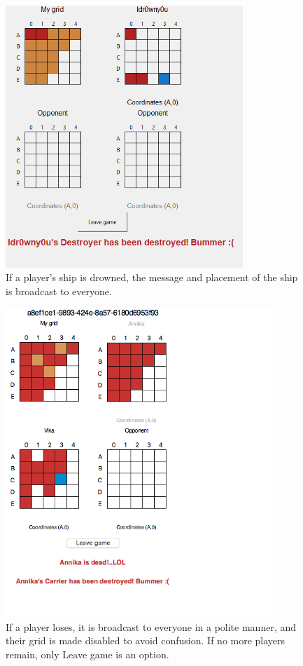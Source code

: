\documentclass[]{article}
\begin{document}
\begin{figure}[!hbt]
	\centering
	\includegraphics[width=0.8\textwidth]{ShipDown.png}
	\caption{If a player's ship is drowned, the message and placement of the ship is broadcast to everyone.}
	\label{fig:Shipdown}
\end{figure}

\begin{figure}[!hbt]
	\centering
	\includegraphics[width=0.9\textwidth]{PlayLost.png}
	\caption{If a player loses, it is broadcast to everyone in a polite manner, and their grid is made disabled to avoid confusion. If no more players remain, only Leave game is an option.}
	\label{fig:Playlost}
\end{figure}
\end{document}
